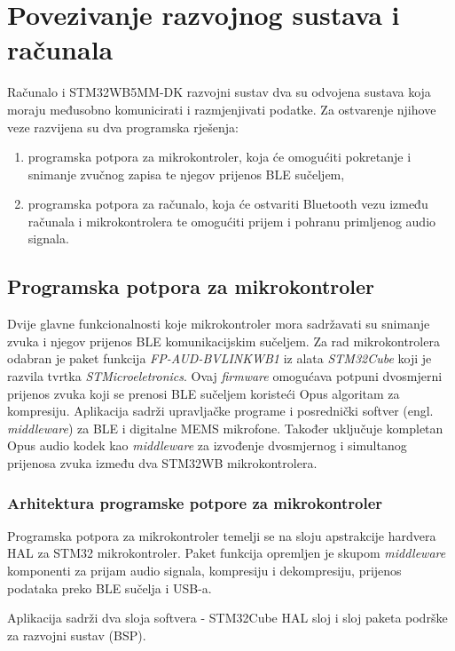 \chapter{Povezivanje razvojnog sustava i računala}

Računalo i STM32WB5MM-DK razvojni sustav dva su odvojena sustava koja moraju međusobno komunicirati i razmjenjivati podatke. Za ostvarenje njihove veze razvijena su dva programska rješenja:
\begin{enumerate}
	\item programska potpora za mikrokontroler, koja će omogućiti pokretanje i snimanje zvučnog zapisa te njegov prijenos BLE sučeljem,
	\item programska potpora za računalo, koja će ostvariti Bluetooth vezu između računala i mikrokontrolera te omogućiti prijem i pohranu primljenog audio signala.
\end{enumerate} 

\section{Programska potpora za mikrokontroler}

Dvije glavne funkcionalnosti koje mikrokontroler mora sadržavati su snimanje zvuka i njegov prijenos BLE komunikacijskim sučeljem. Za rad mikrokontrolera odabran je paket funkcija \textit{FP-AUD-BVLINKWB1} iz alata \textit{STM32Cube} koji je razvila tvrtka \textit{STMicroeletronics}. Ovaj \textit{firmware} omogućava potpuni dvosmjerni prijenos zvuka koji se prenosi BLE sučeljem koristeći Opus algoritam za kompresiju. Aplikacija sadrži upravljačke programe i posrednički softver (engl. \textit{middleware}) za BLE i digitalne MEMS mikrofone. Također uključuje kompletan Opus audio kodek kao \textit{middleware} za izvođenje dvosmjernog i simultanog prijenosa zvuka između dva STM32WB mikrokontrolera. 

\subsection{Arhitektura programske potpore za mikrokontroler}

Programska potpora za mikrokontroler temelji se na sloju apstrakcije hardvera HAL za STM32 mikrokontroler. Paket funkcija opremljen je skupom \textit{middleware} komponenti za prijam audio signala, kompresiju i
dekompresiju, prijenos podataka preko BLE sučelja i USB-a.

Aplikacija sadrži dva sloja softvera - STM32Cube HAL sloj i sloj paketa podrške za razvojni sustav (BSP).

